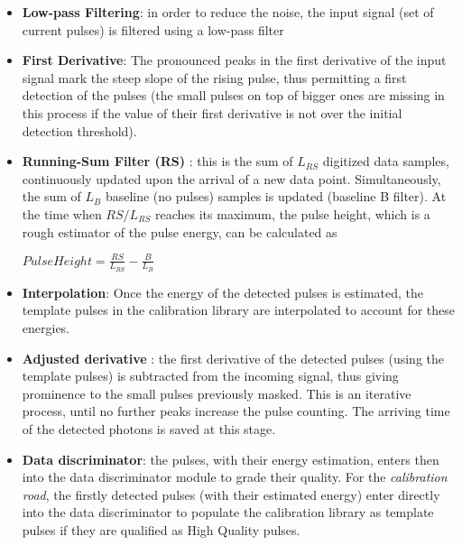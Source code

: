 \begin{itemize}
 \item \textbf{Low-pass Filtering}: in order to reduce the noise, the input signal (set of current pulses) is filtered using a low-pass filter
 \item \textbf{First Derivative}: The pronounced peaks in the first derivative of the input signal mark the steep slope of the rising pulse, thus permitting a first detection of the pulses (the small pulses on top of bigger ones are missing in this process if the value of their first derivative is not over the initial detection threshold).
 \item \textbf{Running-Sum Filter (RS)} \citep{RS_2011}: this is the sum of $L_{RS}$ digitized data samples, continuously updated upon the arrival of a new data point. Simultaneously, the sum of $L_B$ baseline (no pulses) samples is updated (baseline B filter). At the time when $RS/L_{RS}$ reaches its maximum, the pulse height, which is a rough estimator of the pulse energy, can be calculated as 
 
 $ PulseHeight = \frac{RS}{L_{RS}} - \frac{B}{L_B} $
 
 \item \textbf{Interpolation}: Once the energy of the detected pulses is estimated, the template pulses in the calibration library are interpolated to account  for these energies.
 \item \textbf{Adjusted derivative} \citep{Boyce_1999}: the first derivative of the detected pulses (using the template pulses) is subtracted from the incoming signal, thus giving prominence to the small pulses previously masked. This is an iterative process, until no further peaks increase the pulse counting. The arriving time of the detected photons is saved at this stage. 
 \item \textbf{Data discriminator}: the pulses, with their energy estimation, enters then into the data discriminator module to grade their quality. For the \textit{calibration road}, the firstly detected pulses (with their estimated energy) enter directly into the data discriminator to populate the calibration library as template pulses if they are qualified as High Quality pulses.
\end{itemize}

